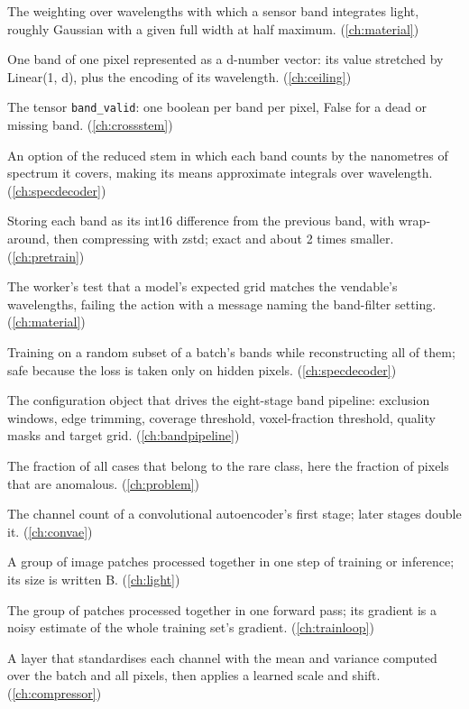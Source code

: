 \begin{description}[style=nextline,leftmargin=1.2em,font=\normalfont\bfseries]
\item[Band response] The weighting over wavelengths with which a sensor band integrates light, roughly Gaussian with a given full width at half maximum. (\cref{ch:material})
\item[Band token] One band of one pixel represented as a d-number vector: its value stretched by Linear(1, d), plus the encoding of its wavelength. (\cref{ch:ceiling})
\item[Band validity mask] The tensor \texttt{band\_valid}: one boolean per band per pixel, False for a dead or missing band. (\cref{ch:crossstem})
\item[Band weighting by width] An option of the reduced stem in which each band counts by the nanometres of spectrum it covers, making its means approximate integrals over wavelength. (\cref{ch:specdecoder})
\item[Band-delta compression] Storing each band as its int16 difference from the previous band, with wrap-around, then compressing with zstd; exact and about 2 times smaller. (\cref{ch:pretrain})
\item[Band-grid check] The worker's test that a model's expected grid matches the vendable's wavelengths, failing the action with a message naming the band-filter setting. (\cref{ch:material})
\item[Band-list augmentation] Training on a random subset of a batch's bands while reconstructing all of them; safe because the loss is taken only on hidden pixels. (\cref{ch:specdecoder})
\item[BandFilterConfig] The configuration object that drives the eight-stage band pipeline: exclusion windows, edge trimming, coverage threshold, voxel-fraction threshold, quality masks and target grid. (\cref{ch:bandpipeline})
\item[Base rate] The fraction of all cases that belong to the rare class, here the fraction of pixels that are anomalous. (\cref{ch:problem})
\item[Base width] The channel count of a convolutional autoencoder's first stage; later stages double it. (\cref{ch:convae})
\item[Batch] A group of image patches processed together in one step of training or inference; its size is written B. (\cref{ch:light})
\item[Batch (mini-batch)] The group of patches processed together in one forward pass; its gradient is a noisy estimate of the whole training set's gradient. (\cref{ch:trainloop})
\item[Batch normalisation] A layer that standardises each channel with the mean and variance computed over the batch and all pixels, then applies a learned scale and shift. (\cref{ch:compressor})

\end{description}

